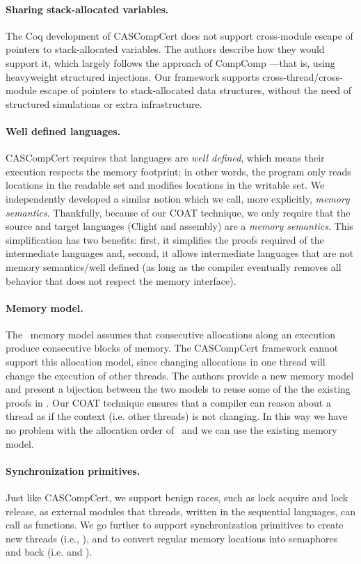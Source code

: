 \paragraph{Sharing stack-allocated variables.} The Coq development of CASCompCert does not support cross-module escape of pointers to stack-allocated
variables. The authors describe how they would support it, which largely follows the approach of CompComp \cite{compcomp}---that is, using heavyweight structured injections. Our framework supports cross-thread/cross-module escape of pointers to stack-allocated data structures, without the need of structured simulations or extra infrastructure. 

\paragraph{Well defined languages.} CASCompCert requires that languages are \emph{well defined}, which means their execution respects the memory footprint;  in other words, the program only reads locations in the readable set and modifies locations in the writable set. We independently developed a similar notion which we call, more explicitly, \emph{memory semantics}. Thankfully, because of our COAT technique, we only require that the source and target languages (Clight and assembly) are a \emph{memory semantics}. This simplification has two benefits: first, it simplifies the proofs required of the intermediate languages and, second, it allows intermediate languages that are not memory semantics/well defined (as long as the compiler eventually removes all behavior that does not respect the memory interface). 

\paragraph{Memory model.} The \compcert\ memory model assumes that consecutive allocations along an execution produce consecutive blocks of memory. The CASCompCert framework cannot support this allocation model, since changing allocations in one thread will change the execution of other threads. The authors provide a new memory model  and present a bijection between the two models to reuse some of the the existing proofs in \compcert. Our COAT technique ensures that a compiler can reason about a thread as if the context (i.e. other threads) is not changing. In this way we have no problem with the allocation order of \compcert\ and we can use the existing memory model. 

\paragraph{Synchronization primitives.} Just like CASCompCert, we support benign races, such as lock acquire and lock release, as external modules that threads, written in the sequential languages, can call as functions. We go further to support synchronization primitives to create new threads (i.e., ), and to convert regular memory locations into semaphores and back (i.e.  and ).

